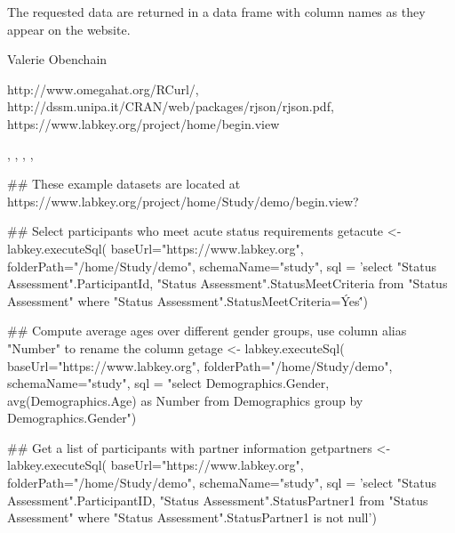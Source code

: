 \begin{Value}
The requested data are returned in a data frame with column names as they appear on the website.
\end{Value}
\begin{Author}\relax
Valerie Obenchain
\end{Author}
\begin{References}\relax
http://www.omegahat.org/RCurl/,\\ 
http://dssm.unipa.it/CRAN/web/packages/rjson/rjson.pdf,\\
https://www.labkey.org/project/home/begin.view
\end{References}
\begin{SeeAlso}\relax
{}, , , 
, 
\end{SeeAlso}
\begin{Examples}
\begin{ExampleCode}
## These example datasets are located at https://www.labkey.org/project/home/Study/demo/begin.view?

## Select participants who meet acute status requirements
getacute <- labkey.executeSql(
baseUrl="https://www.labkey.org",
folderPath="/home/Study/demo",
schemaName="study",
sql = 'select "Status Assessment".ParticipantId, "Status Assessment".StatusMeetCriteria 
from "Status Assessment" where "Status Assessment".StatusMeetCriteria=\'Yes\'')

## Compute average ages over different gender groups, use column alias "Number" to rename the column
getage <- labkey.executeSql(
baseUrl="https://www.labkey.org",
folderPath="/home/Study/demo",
schemaName="study",
sql = "select Demographics.Gender, avg(Demographics.Age) as Number from Demographics 
group by Demographics.Gender")

## Get a list of participants with partner information 
getpartners <- labkey.executeSql(
baseUrl="https://www.labkey.org",
folderPath="/home/Study/demo",
schemaName="study",
sql = 'select "Status Assessment".ParticipantID, "Status Assessment".StatusPartner1 
from "Status Assessment" where "Status Assessment".StatusPartner1 is not null')

\end{ExampleCode}
\end{Examples}

